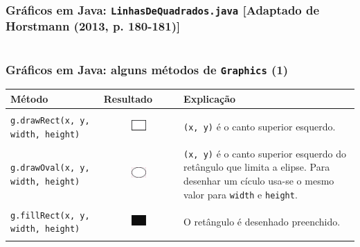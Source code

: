 \documentclass[xcolor={dvipsnames,table},aspectratio=169]{beamer}
\begin{document}
\begin{frame}[fragile]\frametitle{Gráficos em Java: \texttt{LinhasDeQuadrados.java} {\tiny [Adaptado de Horstmann (2013, p. 180-181)]}}
\tiny{\inputminted[bgcolor=cyan!10]{java}{src/LinhasDeQuadrados.java}}
\end{frame}

\begin{frame}[fragile]\frametitle{Gráficos em Java: alguns métodos de \texttt{Graphics} (1)}
{\scriptsize
\begin{center}
  \begin{tabular}{|p{6cm}|p{3cm}|p{4cm}|}
\hline
    \textbf{Método} & \textbf{Resultado} & \textbf{Explicação} \\
\hline
\texttt{g.drawRect(x, y, width, height)}
&
\begin{figure}[h]
	\includegraphics[height=0.1\paperheight,center]{pucrs-ep-fprog-unidade_04-lacos-laminas-retangulo.png}
\end{figure}
& \texttt{(x, y)} é o canto superior esquerdo.\\
\hline
\texttt{g.drawOval(x, y, width, height)}
&
\begin{figure}[h]
	\includegraphics[height=0.1\paperheight,center]{pucrs-ep-fprog-unidade_04-lacos-laminas-elipse.png}
\end{figure}
& \texttt{(x, y)} é o canto superior esquerdo do retângulo que limita a elipse. Para desenhar um cículo usa-se o mesmo valor para \texttt{width} e \texttt{height}.\\
\hline
\texttt{g.fillRect(x, y, width, height)}
&
\begin{figure}[h]
	\includegraphics[height=0.1\paperheight,center]{pucrs-ep-fprog-unidade_04-lacos-laminas-retangulo_preenchido.png}
\end{figure}
& O retângulo é desenhado preenchido.\\
\hline
  \end{tabular}
\end{center}
}
\end{frame}
\end{document}
